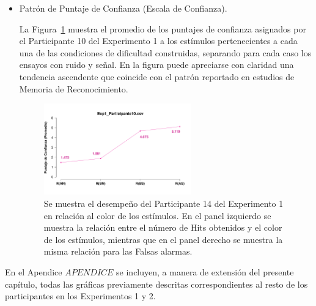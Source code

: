 \begin{itemize}

\item Patrón de Puntaje de Confianza (Escala de Confianza).

La Figura~\ref{fig:MirrorRating_E1_P10} muestra el promedio de los puntajes de confianza asignados por el Participante 10 del Experimento 1 a los estímulos pertenecientes a cada una de las condiciones de dificultad construidas, separando para cada caso los ensayos con ruido y señal. En la figura puede apreciarse con claridad una tendencia ascendente que coincide con el patrón reportado en estudios de Memoria de Reconocimiento.\\

\begin{figure}[th]
\centering
\includegraphics[width=0.60\textwidth]{Figures/MirrorRating_Exp1_P10}
\caption[Comparación entre Puntajes de Confianza asignados por Condición; Ejemplo]{Se muestra el desempeño del Participante 14 del Experimento 1 en relación al color de los estímulos. En el panel izquierdo se muestra la relación entre el número de Hits obtenidos y el color de los estímulos, mientras que en el panel derecho se muestra la misma relación para las Falsas alarmas.}
\label{fig:MirrorRating_E1_P10}
\end{figure}


\end{itemize}


En el Apendice $APENDICE$ se incluyen, a manera de extensión del presente capítulo, todas las gráficas previamente descritas correspondientes al resto de los participantes en los Experimentos 1 y 2.

